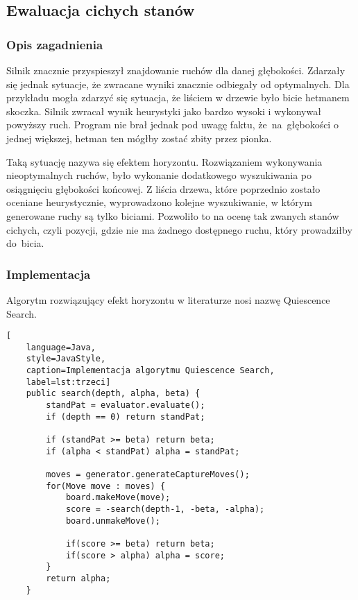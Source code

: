 \subsection{Ewaluacja cichych stanów}
\label{subsec:ewaluacja-cichych-stanow}

\subsubsection{Opis zagadnienia}
Silnik znacznie przyspieszył znajdowanie ruchów dla danej głębokości.
Zdarzały się jednak sytuacje, że zwracane wyniki znacznie odbiegały od optymalnych.
Dla przykładu mogła zdarzyć się sytuacja, że liściem w drzewie było bicie hetmanem skoczka.
Silnik zwracał wynik heurystyki jako bardzo wysoki i wykonywał powyższy ruch.
Program nie brał jednak pod uwagę faktu, że~na~głębokości o jednej większej, hetman ten mógłby zostać zbity przez pionka.

Taką sytuację nazywa się efektem horyzontu.
Rozwiązaniem wykonywania nieoptymalnych ruchów, było wykonanie dodatkowego wyszukiwania po osiągnięciu głębokości końcowej.
Z liścia drzewa, które poprzednio zostało oceniane heurystycznie, wyprowadzono kolejne wyszukiwanie, w którym generowane ruchy są tylko biciami.
Pozwoliło to na ocenę tak zwanych stanów cichych, czyli pozycji, gdzie nie ma żadnego dostępnego ruchu, który prowadziłby do~bicia.

\subsubsection{Implementacja}

Algorytm rozwiązujący efekt horyzontu w literaturze nosi nazwę Quiescence Search.

\begin{lstlisting}[
    language=Java,
    style=JavaStyle,
    caption=Implementacja algorytmu Quiescence Search,
    label=lst:trzeci]
    public search(depth, alpha, beta) {
        standPat = evaluator.evaluate();
        if (depth == 0) return standPat;

        if (standPat >= beta) return beta;
        if (alpha < standPat) alpha = standPat;

        moves = generator.generateCaptureMoves();
        for(Move move : moves) {
            board.makeMove(move);
            score = -search(depth-1, -beta, -alpha);
            board.unmakeMove();

            if(score >= beta) return beta;
            if(score > alpha) alpha = score;
        }
        return alpha;
    }
\end{lstlisting}

